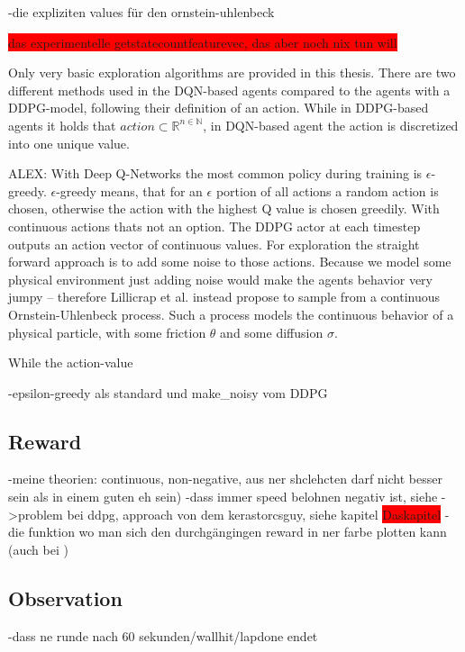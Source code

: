 -die expliziten values für den ornstein-uhlenbeck

\colorbox{red}{das experimentelle getstatecountfeaturevec, das aber noch nix tun will}


Only very basic exploration algorithms are provided in this thesis. There are two different methods used in the DQN-based agents compared to the agents with a DDPG-model, following their definition of an action. While in DDPG-based agents it holds that $action \subset \mathds{R}^{n \in \mathds{N}}$, in DQN-based agent the action is discretized into one unique value. 

ALEX: 
With Deep Q-Networks the most common policy during training is $\epsilon$-greedy. $\epsilon$-greedy means, that for an $\epsilon$ portion of all actions a random action is chosen, otherwise the action with the highest Q value is chosen greedily.
With continuous actions thats not an option. The DDPG actor at each timestep outputs an action vector of continuous values. For exploration the straight forward approach is to add some noise to those actions. Because we model some physical environment just adding noise would make the agents behavior very jumpy -- therefore Lillicrap et al. instead propose to sample from a continuous Ornstein-Uhlenbeck process. Such a process models the continuous behavior of a physical particle, with some friction $\theta$ and some diffusion $\sigma$.


While the action-value 

-epsilon-greedy als standard und make_noisy vom DDPG


\subsection{Reward}

-meine theorien: continuous, non-negative, aus ner shclehcten darf nicht besser sein als in einem guten eh sein)
-dass immer speed belohnen negativ ist, siehe ->problem bei ddpg, approach von dem kerastorcsguy, siehe kapitel \colorbox{red}{Daskapitel}
-die funktion wo man sich den durchgängingen reward in ner farbe plotten kann (auch bei )

\subsection{Observation}





-dass ne runde nach 60 sekunden/wallhit/lapdone endet 

